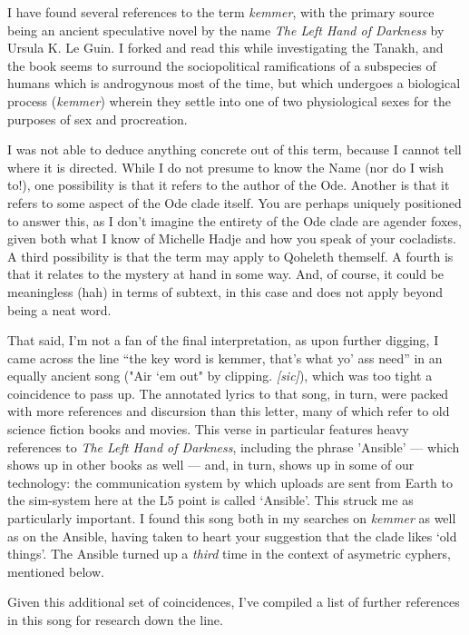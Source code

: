I have found several references to the term \emph{kemmer}, with the primary source being an ancient speculative novel by the name \emph{The Left Hand of Darkness} by Ursula K. Le Guin. I forked and read this while investigating the Tanakh, and the book seems to surround the sociopolitical ramifications of a subspecies of humans which is androgynous most of the time, but which undergoes a biological process (\emph{kemmer}) wherein they settle into one of two physiological sexes for the purposes of sex and procreation.

I was not able to deduce anything concrete out of this term, because I cannot tell where it is directed. While I do not presume to know the Name (nor do I wish to!), one possibility is that it refers to the author of the Ode. Another is that it refers to some aspect of the Ode clade itself. You are perhaps uniquely positioned to answer this, as I don't imagine the entirety of the Ode clade are agender foxes, given both what I know of Michelle Hadje and how you speak of your cocladists. A third possibility is that the term may apply to Qoheleth themself. A fourth is that it relates to the mystery at hand in some way. And, of course, it could be meaningless (hah) in terms of subtext, in this case and does not apply beyond being a neat word.

That said, I'm not a fan of the final interpretation, as upon further digging, I came across the line ``the key word is kemmer, that's what yo' ass need'' in an equally ancient song ("Air `em out" by clipping. \emph{{[}sic{]}}), which was too tight a coincidence to pass up. The annotated lyrics to that song, in turn, were packed with more references and discursion than this letter, many of which refer to old science fiction books and movies. This verse in particular features heavy references to \emph{The Left Hand of Darkness}, including the phrase 'Ansible' — which shows up in other books as well — and, in turn, shows up in some of our technology: the communication system by which uploads are sent from Earth to the sim-system here at the L5 point is called `Ansible'. This struck me as particularly important. I found this song both in my searches on \emph{kemmer} as well as on the Ansible, having taken to heart your suggestion that the clade likes `old things'. The Ansible turned up a \emph{third} time in the context of asymetric cyphers, mentioned below.

Given this additional set of coincidences, I've compiled a list of further references in this song for research down the line.

